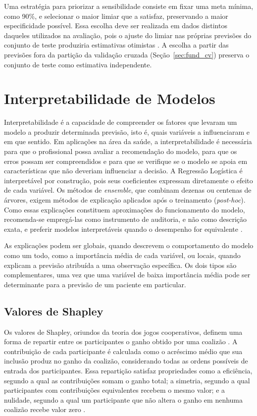 Uma estratégia para priorizar a sensibilidade consiste em fixar uma meta mínima, como 90\%, e selecionar o maior limiar que a satisfaz, preservando a maior especificidade possível. Essa escolha deve ser realizada em dados distintos daqueles utilizados na avaliação, pois o ajuste do limiar nas próprias previsões do conjunto de teste produziria estimativas otimistas \cite{Leeflang2008Bias}. A escolha a partir das previsões fora da partição da validação cruzada (Seção~\ref{sec:fund_cv}) preserva o conjunto de teste como estimativa independente.

\section{Interpretabilidade de Modelos}
\label{sec:fund_interpretabilidade}

Interpretabilidade é a capacidade de compreender os fatores que levaram um modelo a produzir determinada previsão, isto é, quais variáveis a influenciaram e em que sentido. Em aplicações na área da saúde, a interpretabilidade é necessária para que o profissional possa avaliar a recomendação do modelo, para que os erros possam ser compreendidos e para que se verifique se o modelo se apoia em características que não deveriam influenciar a decisão. A Regressão Logística é interpretável por construção, pois seus coeficientes expressam diretamente o efeito de cada variável. Os métodos de \textit{ensemble}, que combinam dezenas ou centenas de árvores, exigem métodos de explicação aplicados após o treinamento (\textit{post-hoc}). Como essas explicações constituem aproximações do funcionamento do modelo, recomenda-se empregá-las como instrumento de auditoria, e não como descrição exata, e preferir modelos interpretáveis quando o desempenho for equivalente \cite{Rudin2019Stop}.

As explicações podem ser globais, quando descrevem o comportamento do modelo como um todo, como a importância média de cada variável, ou locais, quando explicam a previsão atribuída a uma observação específica. Os dois tipos são complementares, uma vez que uma variável de baixa importância média pode ser determinante para a previsão de um paciente em particular.

\subsection{Valores de Shapley}
\label{sec:fund_shapley}

Os valores de Shapley, oriundos da teoria dos jogos cooperativos, definem uma forma de repartir entre os participantes o ganho obtido por uma coalizão \cite{Shapley1953Value}. A contribuição de cada participante é calculada como o acréscimo médio que sua inclusão produz no ganho da coalizão, considerando todas as ordens possíveis de entrada dos participantes. Essa repartição satisfaz propriedades como a eficiência, segundo a qual as contribuições somam o ganho total; a simetria, segundo a qual participantes com contribuições equivalentes recebem o mesmo valor; e a nulidade, segundo a qual um participante que não altera o ganho em nenhuma coalizão recebe valor zero \cite{Shapley1953Value}.

